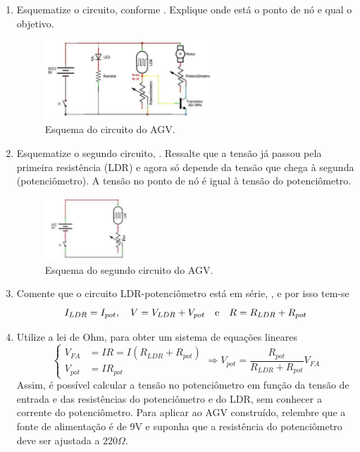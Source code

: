 \documentclass{textolivre}
\begin{document}
\begin{enumerate}
\item Esquematize o circuito, conforme . Explique onde está o ponto
de nó e qual o objetivo.

\begin{figure}[h!]
\centering
\includegraphics[width=0.6\textwidth]{figure-33.pdf}
\caption{Esquema do circuito do AGV.}
\label{fig23}
\end{figure}

\item Esquematize o segundo circuito, . Ressalte que a tensão já
passou pela primeira resistência (LDR) e agora só depende da tensão que chega à
segunda (potenciômetro). A tensão no ponto de nó é igual à tensão do
potenciômetro.

\begin{figure}[h!]
\centering
\includegraphics[width=0.3\textwidth]{figure-34.pdf}
\caption{Esquema do segundo circuito do AGV.}
\label{fig24}
\end{figure}

\item Comente que o circuito LDR-potenciômetro está em série, , e por isso tem-se
\begin{equation*}
I_{LDR} = I_{pot}, \quad V = V_{LDR} + V_{pot} \quad \textmd{e} \quad R=R_{LDR} + R_{pot}
\end{equation*}

\item Utilize a lei de Ohm, para obter um sistema de equações lineares
\begin{equation*}
\begin{cases}
V_{FA} &= IR = I(R_{LDR}+R_{pot}) \\
V_{pot} &= I R_{pot}
\end{cases} 
\Rightarrow V_{pot} = \frac{R_{pot}}{R_{LDR} + R_{pot}} V_{FA}
\end{equation*}
Assim, é possível calcular a tensão no potenciômetro em função da tensão de
entrada e das resistências do potenciômetro e do LDR, sem conhecer a corrente
do potenciômetro. Para aplicar ao AGV construído, relembre que a fonte de
alimentação é de 9V e suponha que a resistência do potenciômetro deve ser
ajustada a $220\Omega$.


\end{enumerate}
\end{document}
